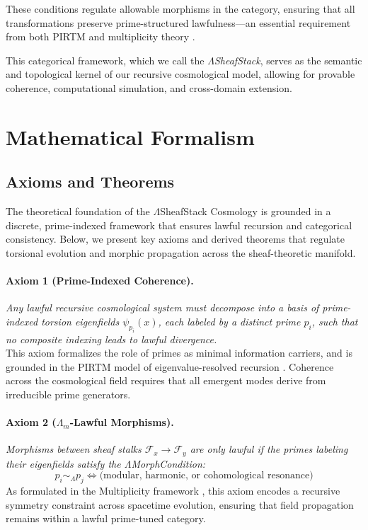 \documentclass{article}
\theoremstyle{plain}
\begin{document}
These conditions regulate allowable morphisms in the category, ensuring that all transformations preserve prime-structured lawfulness—an essential requirement from both PIRTM and multiplicity theory \cite{vanGelder2025PIRTM,vanGelder2025Multiplicity}.

This categorical framework, which we call the \emph{$\Lambda$SheafStack}, serves as the semantic and topological kernel of our recursive cosmological model, allowing for provable coherence, computational simulation, and cross-domain extension.


\section{Mathematical Formalism}

\subsection{Axioms and Theorems}

The theoretical foundation of the $\Lambda$SheafStack Cosmology is grounded in a discrete, prime-indexed framework that ensures lawful recursion and categorical consistency. Below, we present key axioms and derived theorems that regulate torsional evolution and morphic propagation across the sheaf-theoretic manifold.

\paragraph{Axiom 1 (Prime-Indexed Coherence).}
\textit{Any lawful recursive cosmological system must decompose into a basis of prime-indexed torsion eigenfields $\psi_{p_i}(x)$, each labeled by a distinct prime $p_i$, such that no composite indexing leads to lawful divergence.}  
\\[0.5em]
This axiom formalizes the role of primes as minimal information carriers, and is grounded in the PIRTM model of eigenvalue-resolved recursion \cite{vanGelder2025PIRTM}. Coherence across the cosmological field requires that all emergent modes derive from irreducible prime generators.

\paragraph{Axiom 2 ($\Lambda_m$-Lawful Morphisms).}
\textit{Morphisms between sheaf stalks $\mathcal{F}_x \to \mathcal{F}_y$ are only lawful if the primes labeling their eigenfields satisfy the $\Lambda$MorphCondition:}
\[
p_i \sim_\Lambda p_j \iff \text{(modular, harmonic, or cohomological resonance)}
\]
As formulated in the Multiplicity framework \cite{vanGelder2025Multiplicity}, this axiom encodes a recursive symmetry constraint across spacetime evolution, ensuring that field propagation remains within a lawful prime-tuned category.
\end{document}
